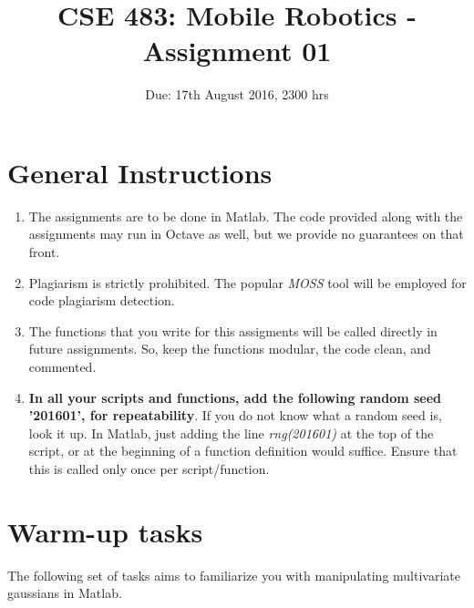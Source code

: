 \documentclass{article}
\title{\textbf{CSE 483: Mobile Robotics - Assignment 01}}
\author{Due: 17th August 2016, 2300 hrs}
\begin{document}
\maketitle

\section*{General Instructions}
\begin{enumerate}
\item The assignments are to be done in Matlab. The code provided along with the assignments may run in Octave as well, but we provide no guarantees on that front.
\item Plagiarism is strictly prohibited. The popular \emph{MOSS} tool will be employed for code plagiarism detection.
\item The functions that you write for this assigments will be called directly in future assignments. So, keep the functions modular, the code clean, and commented.
\item \textbf{In all your scripts and functions, add the following random seed '201601', for repeatability}. If you do not know what a random seed is, look it up. In Matlab, just adding the line \emph{rng(201601)} at the top of the script, or at the beginning of a function definition would suffice. Ensure that this is called only once per script/function.
\end{enumerate}

\section{Warm-up tasks}

The following set of tasks aims to familiarize you with manipulating multivariate gaussians in Matlab.
\end{document}
